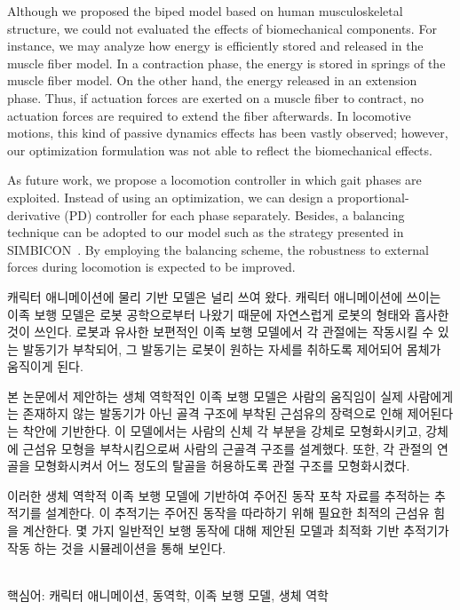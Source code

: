\documentclass[master,english,final]{kaist-ucs}
\begin{document}

Although we proposed the biped model based on
human musculoskeletal structure,
we could not evaluated the effects of biomechanical
components.
For instance, we may analyze how energy is efficiently
stored and released in the muscle fiber model.
In a contraction phase, the energy is stored in springs
of the muscle fiber model. On the other hand, the energy released
in an extension phase.
Thus, if actuation forces are exerted on a muscle fiber to contract,
no actuation forces are required to extend the fiber afterwards.
In locomotive motions, this kind of passive dynamics effects has been
vastly observed; however, our optimization formulation was not able to
reflect the biomechanical effects.


As future work, we propose a locomotion controller in which gait phases
are exploited. Instead of using an optimization, we can design
a proportional-derivative (PD) controller for each phase separately.
Besides, a balancing technique can be adopted to our model such as the strategy
presented in SIMBICON~\cite{journals/tog/YinLP07}. By employing the balancing
scheme, the robustness to external forces during locomotion is expected to be improved.




\begin{summary}

캐릭터 애니메이션에 물리 기반 모델은 널리 쓰여 왔다.
캐릭터 애니메이션에 쓰이는 이족 보행 모델은 로봇 공학으로부터 나왔기 때문에
자연스럽게 로봇의 형태와 흡사한 것이 쓰인다.
로봇과 유사한 보편적인 이족 보행 모델에서 각 관절에는 작동시킬 수 있는 발동기가
부착되어, 그 발동기는 로봇이 원하는 자세를 취하도록 제어되어 몸체가 움직이게 된다.

본 논문에서 제안하는 생체 역학적인 이족 보행 모델은
사람의 움직임이 실제 사람에게는 존재하지 않는
발동기가 아닌 골격 구조에 부착된 근섬유의 장력으로 인해
제어된다는 착안에 기반한다.
이 모델에서는 사람의 신체 각 부분을 강체로 모형화시키고,
강체에 근섬유 모형을 부착시킴으로써 사람의 근골격 구조를
설계했다. 또한, 각 관절의 연골을 모형화시켜서 어느 정도의
탈골을 허용하도록 관절 구조를 모형화시켰다.

이러한 생체 역학적 이족 보행 모델에 기반하여
주어진 동작 포착 자료를 추적하는 추적기를 설계한다.
이 추적기는 주어진 동작을 따라하기 위해 필요한 최적의 근섬유 힘을 계산한다.
몇 가지 일반적인 보행 동작에 대해 제안된 모델과 최적화 기반 추적기가
작동 하는 것을 시뮬레이션을 통해 보인다.

\noindent
\\핵심어: 캐릭터 애니메이션, 동역학, 이족 보행 모델, 생체 역학
\end{summary}
\end{document}
